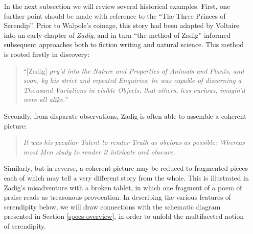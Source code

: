 In the next subsection we will review several historical examples.
First, one further point should be made with reference to the ``The
Three Princes of Serendip''.  Prior to Walpole's coinage, this story
had been adapted by Voltaire into an early chapter of \emph{Zadig},
and in turn ``the method of Zadig'' informed subsequent approaches
both to fiction writing and natural science.  This method is rooted
firstly in discovery:

\begin{quote}
``[Zadig] \emph{pry’d into the Nature and Properties of Animals and
    Plants, and soon, by his strict and repeated Enquiries, he was
    capable of discerning a Thousand Variations in visible Objects,
    that others, less curious, imagin’d were all
    alike.}''~\cite[pp. 21--22]{zadig}
\end{quote}

\noindent Secondly, from disparate observations, Zadig is often able
to assemble a coherent picture:
\begin{quote}
\emph{It was his peculiar Talent to render Truth as obvious as
  possible: Whereas most Men study to render it intricate and
  obscure.}~\cite[p. 54]{zadig}
\end{quote}
Similarly, but in reverse, a coherent picture may be reduced to
fragmented pieces each of which may tell a very different story from
the whole.  This is illustrated in Zadig's misadventure with a broken
tablet, in which one fragment of a poem of praise reads as treasonous
provocation.  In describing the various features of serendipity below,
we will draw connections with the schematic diagram presented in
Section \ref{specs-overview}, in order to unfold the multifaceted
notion of serendipity.

